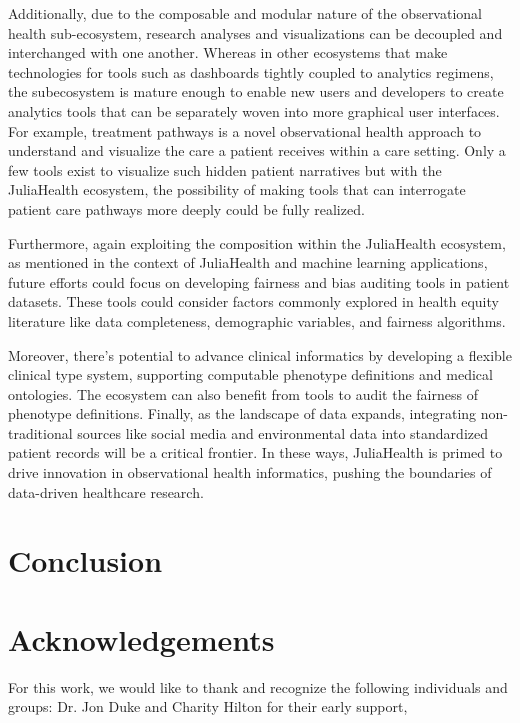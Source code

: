 \documentclass{juliacon}
\begin{document}
Additionally, due to the composable and modular nature of the observational health sub-ecosystem, research analyses and visualizations can be decoupled and interchanged with one another.
Whereas in other ecosystems that make technologies for tools such as dashboards tightly coupled to analytics regimens, the subecosystem is mature enough to enable new users and developers to create analytics tools that can be separately woven into more graphical user interfaces.
For example, treatment pathways is a novel observational health approach to understand and visualize the care a patient receives within a care setting.
Only a few tools exist to visualize such hidden patient narratives but with the JuliaHealth ecosystem, the possibility of making tools that can interrogate patient care pathways more deeply could be fully realized.

Furthermore, again exploiting the composition within the JuliaHealth ecosystem, as mentioned in the context of JuliaHealth and machine learning applications, future efforts could focus on developing fairness and bias auditing tools in patient datasets.
These tools could consider factors commonly explored in health equity literature like data completeness, demographic variables, and fairness algorithms. 

Moreover, there's potential to advance clinical informatics by developing a flexible clinical type system, supporting computable phenotype definitions and medical ontologies. The ecosystem can also benefit from tools to audit the fairness of phenotype definitions. Finally, as the landscape of data expands, integrating non-traditional sources like social media and environmental data into standardized patient records will be a critical frontier. In these ways, JuliaHealth is primed to drive innovation in observational health informatics, pushing the boundaries of data-driven healthcare research.


\section{Conclusion}



\section{Acknowledgements}

For this work, we would like to thank and recognize the following individuals and groups: Dr. Jon Duke and Charity Hilton for their early support, 
\end{document}
